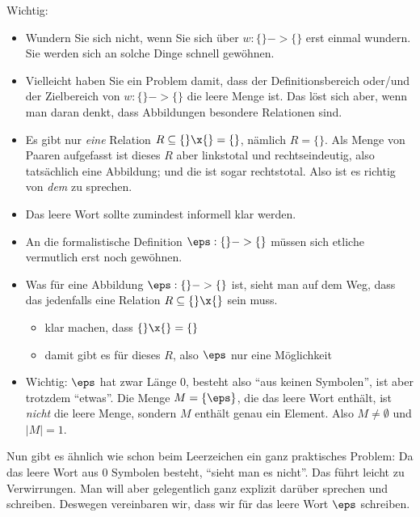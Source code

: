 Wichtig:
\begin{itemize}
\item Wundern Sie sich nicht, wenn Sie sich über $w:\{\} -> \{\}$ erst
  einmal wundern. Sie werden sich an solche Dinge schnell gewöhnen.
\item Vielleicht haben Sie ein Problem damit, dass der
  Definitionsbereich oder/und der Zielbereich von $w:\{\} -> \{\}$ die
  leere Menge ist. Das löst sich aber, wenn man daran denkt, dass
  Abbildungen besondere Relationen sind.
\item Es gibt nur \emph{eine} Relation $R\subseteq \{\}\x\{\} = \{\}$,
  nämlich $R=\{\}$. Als Menge von Paaren aufgefasst ist dieses $R$
  aber linkstotal und rechtseindeutig, also tatsächlich eine
  Abbildung; und die ist sogar rechtstotal. Also ist es richtig von
  \emph{dem}  zu sprechen.
\end{itemize}
%
\begin{tutorium}
  \begin{itemize}
  \item Das leere Wort sollte zumindest informell klar werden.
  \item An die formalistische Definition $\eps: \{\} -> \{\}$ müssen
    sich etliche vermutlich erst noch gewöhnen.
  \item Was für eine Abbildung $\eps: \{\} -> \{\}$ ist, sieht man auf
    dem Weg, dass das jedenfalls eine Relation $R\subseteq \{\}\x\{\}$
    sein muss.
    \begin{itemize}
    \item klar machen, dass  $\{\}\x\{\}=\{\}$
    \item damit gibt es für dieses $R$, also $\eps$ nur eine
      Möglichkeit
    \end{itemize}
  \item Wichtig: $\eps$ hat zwar Länge $0$, besteht also "`aus keinen
    Symbolen"', ist aber trotzdem "`etwas"'. Die Menge $M=\{\eps\}$,
    die das leere Wort enthält, ist \emph{nicht} die leere Menge,
    sondern $M$ enthält genau ein Element. Also $M\not=\emptyset$ und
    $|M|=1$.
  \end{itemize}
\end{tutorium}
%
Nun gibt es ähnlich wie schon beim Leerzeichen ein ganz praktisches
Problem: Da das leere Wort aus $0$ Symbolen besteht, "`sieht man es
nicht"'. Das führt leicht zu Verwirrungen. Man will aber gelegentlich
ganz explizit darüber sprechen und schreiben. Deswegen vereinbaren
wir, dass wir für das leere Wort $\eps$ schreiben.

